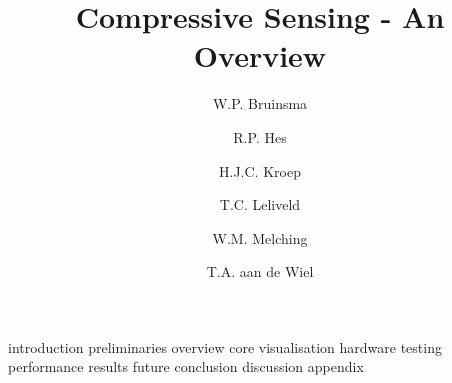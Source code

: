 \documentclass[a4paper, openany, oneside]{memoir}
\title{Compressive Sensing - An Overview}
\author{W.P. Bruinsma \and R.P. Hes \and H.J.C. Kroep \and T.C. Leliveld \and W.M. Melching \and T.A. aan de Wiel}
\begin{document}
{introduction}
{preliminaries}
{overview}
{core}
{visualisation}
{hardware}
{testing}
{performance}
{results}
{future}
{conclusion}
{discussion}
{appendix}
\end{document}
